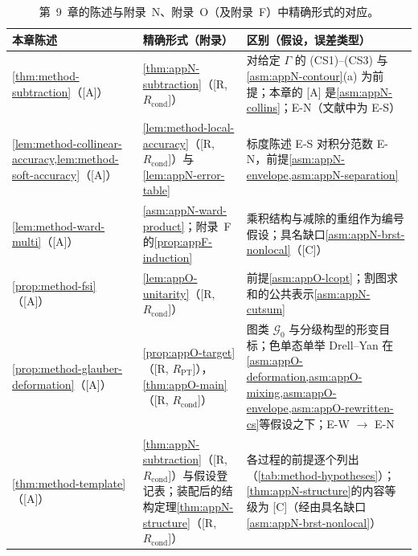 \begin{table}[htbp]
\centering
\footnotesize
\renewcommand{\arraystretch}{1.3}
\begin{tabularx}{\textwidth}{@{}>{\raggedright\arraybackslash}p{3.6cm}>{\raggedright\arraybackslash}p{3.9cm}>{\raggedright\arraybackslash}X@{}}
\toprule
本章陈述 & 精确形式（附录） & 区别（假设，误差类型）\\
\midrule
\cref{thm:method-subtraction}（[A]） & \cref{thm:appN-subtraction}（[R, $R_{\mathrm{cond}}$]） & 对给定 $\Gamma$ 的 (CS1)--(CS3) 与\cref{asm:appN-contour}(a) 为前提；本章的 [A] 是\cref{asm:appN-collins}；E-N（文献中为 E-S）\\
\cref{lem:method-collinear-accuracy,lem:method-soft-accuracy}（[A]） & \cref{lem:method-local-accuracy}（[R, $R_{\mathrm{cond}}$]）与\cref{lem:appN-error-table} & 标度陈述 E-S 对积分范数 E-N，前提\cref{asm:appN-envelope,asm:appN-separation}\\
\cref{lem:method-ward-multi}（[A]） & \cref{asm:appN-ward-product}；附录~F 的\cref{prop:appF-induction} & 乘积结构与减除的重组作为编号假设；具名缺口\cref{asm:appN-brst-nonlocal}（[C]）\\
\cref{prop:method-fsi}（[A]） & \cref{lem:appO-unitarity}（[R, $R_{\mathrm{cond}}$]） & 前提\cref{asm:appO-lcopt}；割图求和的公共表示\cref{asm:appN-cutsum}\\
\cref{prop:method-glauber-deformation}（[A]） & \cref{prop:appO-target}（[R, $R_{\mathrm{PT}}$]），\cref{thm:appO-main}（[R, $R_{\mathrm{cond}}$]） & 图类 $\mathcal G_0$ 与分级构型的形变目标；色单态单举 Drell--Yan 在\cref{asm:appO-deformation,asm:appO-mixing,asm:appO-envelope,asm:appO-rewritten-cs}等假设之下；E-W $\to$ E-N\\
\cref{thm:method-template}（[A]） & \cref{thm:appN-subtraction}（[R, $R_{\mathrm{cond}}$]）与假设登记表；装配后的结构定理\cref{thm:appN-structure}（[R, $R_{\mathrm{cond}}$]） & 各过程的前提逐个列出（\cref{tab:method-hypotheses}）；\cref{thm:appN-structure}的内容等级为 [C]（经由具名缺口\cref{asm:appN-brst-nonlocal}）\\
\bottomrule
\end{tabularx}
\caption{第~9~章的陈述与附录~N、附录~O（及附录~F）中精确形式的对应。}
\label{tab:method-correspondence}
\end{table}
